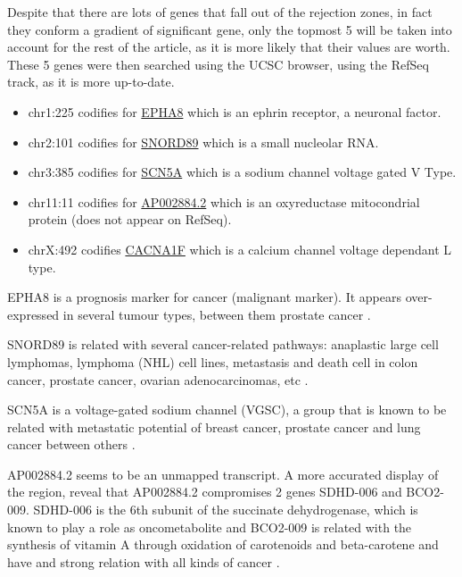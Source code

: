 \documentclass[9pt,twocolumn,twoside]{gsajnl}
\begin{document}
Despite that there are lots of genes that fall out of the rejection zones, in fact they conform a gradient of significant gene, only the topmost 5 will be taken into account for the rest of the article, as it is more likely that their values are worth. These 5 genes were then searched using the UCSC browser, using the RefSeq track, as it is more up-to-date.
\begin{itemize}
\item chr1:225 codifies for \href{http://www.genecards.org/cgi-bin/carddisp.pl?gene=EPHA8}{EPHA8} which is an ephrin receptor, a neuronal factor.
\item chr2:101 codifies for \href{http://www.genecards.org/cgi-bin/carddisp.pl?gene=SNORD89}{SNORD89} which is a small nucleolar RNA.
\item chr3:385 codifies for \href{http://www.genecards.org/cgi-bin/carddisp.pl?gene=SCN5A}{SCN5A} which is a sodium channel voltage gated V Type.
\item chr11:11 codifies for \href{http://www.ensembl.org/Homo_sapiens/Gene/Summary?g=ENSG00000255292;r=11:112086903-112193805}{AP002884.2} which is an oxyreductase mitocondrial protein (does not appear on RefSeq).
\item chrX:492 codifies \href{http://www.genecards.org/cgi-bin/carddisp.pl?gene=CACNA1F}{CACNA1F} which is a calcium channel voltage dependant L type.
\end{itemize}

EPHA8 is a prognosis marker for cancer (malignant marker). It appears over-expressed in several tumour types, between them prostate cancer \cite{proteinatlas}.

SNORD89 is related with several cancer-related pathways:  anaplastic large cell lymphomas, lymphoma (NHL) cell lines, metastasis and death cell in colon cancer, prostate cancer, ovarian adenocarcinomas, etc \cite{tcng}.

SCN5A is a voltage-gated sodium channel (VGSC), a group that is known to be related with metastatic potential of breast cancer, prostate cancer and lung cancer between others \cite{Nelson2015}.

AP002884.2 seems to be an unmapped transcript. A more accurated display of the region, reveal that AP002884.2 compromises 2 genes SDHD-006 and BCO2-009. SDHD-006 is the 6th subunit of the succinate dehydrogenase, which is known to play a role as oncometabolite \cite{oncometabolites} and BCO2-009 is related with the synthesis of vitamin A through oxidation of carotenoids  and beta-carotene and have and strong relation with all kinds of cancer \cite{proteinatlas}.
\end{document}
